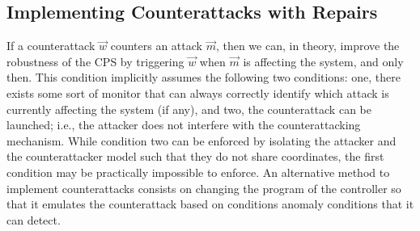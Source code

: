 {{\subsection{Implementing Counterattacks with Repairs}
\label{sec:UrgentAttacker}
If a counterattack $\vec{w}$ counters an attack $\vec{m}$, then we can, in theory, improve the robustness of the CPS by triggering $\vec{w}$ when $\vec{m}$ is affecting the system, and only then. This condition implicitly assumes the following two conditions: one, there exists some sort of monitor that can always correctly identify which attack is currently affecting the system (if any), and two, the counterattack can be launched; i.e., the attacker does not interfere with the counterattacking mechanism. While condition two can be enforced by isolating the attacker and the counterattacker model such that they do not share coordinates, the first condition may be practically impossible to enforce. An alternative method to implement counterattacks consists on changing the program of the controller so that it emulates the counterattack based on conditions anomaly conditions that it can detect. 

}}
